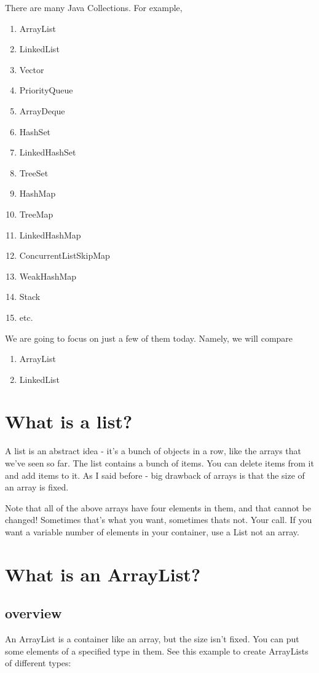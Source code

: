 \documentclass[12pt]{article}
\begin{document}
There are many Java Collections. For example, 

\begin{enumerate}
\item ArrayList
\item LinkedList
\item Vector
\item PriorityQueue
\item ArrayDeque
\item HashSet
\item LinkedHashSet
\item TreeSet
\item HashMap
\item TreeMap
\item LinkedHashMap
\item ConcurrentListSkipMap
\item WeakHashMap
\item Stack
\item etc.
\end{enumerate}

We are going to focus on just a few of them today. Namely, we will compare

\begin{enumerate}
\item ArrayList
\item LinkedList
\end{enumerate}

\section{What is a list?}
A list is an abstract idea - it's a bunch of objects in a row, like the arrays that we've seen so far. The list contains a bunch of items. You can delete items from it and add items to it. As I said before - big drawback of arrays is that the size of an array is fixed.



Note that all of the above arrays have four elements in them, and that cannot be changed! Sometimes that's what you want, sometimes thats not. Your call. If you want a variable number of elements in your container, use a List not an array.

\section{What is an ArrayList?}
\subsection{overview}
An ArrayList is a container like an array, but the size isn't fixed. You can put some elements of a specified type in them. See this example to create ArrayLists of different types:
\end{document}
